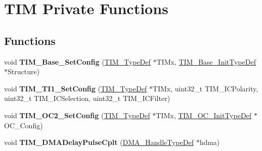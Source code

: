 \hypertarget{group___t_i_m___private___functions}{}\section{T\+IM Private Functions}
\label{group___t_i_m___private___functions}
\subsection*{Functions}
\begin{DoxyCompactItemize}
\item 
\mbox{\label{group___t_i_m___private___functions_ga057e4b4da135186e8fb88327c5fd0684}} 
void {\bfseries T\+I\+M\+\_\+\+Base\+\_\+\+Set\+Config} (\mbox{\hyperlink{struct_t_i_m___type_def}{T\+I\+M\+\_\+\+Type\+Def}} $\ast$T\+I\+Mx, \mbox{\hyperlink{struct_t_i_m___base___init_type_def}{T\+I\+M\+\_\+\+Base\+\_\+\+Init\+Type\+Def}} $\ast$Structure)
\item 
\mbox{\label{group___t_i_m___private___functions_ga83c847710a92f0558c862dd0dc889ff3}} 
void {\bfseries T\+I\+M\+\_\+\+T\+I1\+\_\+\+Set\+Config} (\mbox{\hyperlink{struct_t_i_m___type_def}{T\+I\+M\+\_\+\+Type\+Def}} $\ast$T\+I\+Mx, uint32\+\_\+t T\+I\+M\+\_\+\+I\+C\+Polarity, uint32\+\_\+t T\+I\+M\+\_\+\+I\+C\+Selection, uint32\+\_\+t T\+I\+M\+\_\+\+I\+C\+Filter)
\item 
\mbox{\label{group___t_i_m___private___functions_ga20370137a5c000fa4739d30669e67b8c}} 
void {\bfseries T\+I\+M\+\_\+\+O\+C2\+\_\+\+Set\+Config} (\mbox{\hyperlink{struct_t_i_m___type_def}{T\+I\+M\+\_\+\+Type\+Def}} $\ast$T\+I\+Mx, \mbox{\hyperlink{struct_t_i_m___o_c___init_type_def}{T\+I\+M\+\_\+\+O\+C\+\_\+\+Init\+Type\+Def}} $\ast$O\+C\+\_\+\+Config)
\item 
\mbox{\label{group___t_i_m___private___functions_ga78edd2f05a873d68690d8658aa427ccf}} 
void {\bfseries T\+I\+M\+\_\+\+D\+M\+A\+Delay\+Pulse\+Cplt} (\mbox{\hyperlink{group___d_m_a___exported___types_ga41b754a906b86bce54dc79938970138b}{D\+M\+A\+\_\+\+Handle\+Type\+Def}} $\ast$hdma)
\item 
\mbox{\label{group___t_i_m___private___functions_gaa112bee5279feee040c1ea9e283f7378}} 

\end{DoxyCompactItemize}
